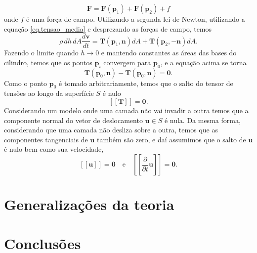 \begin{equation*}
\mathbf{F}=\mathbf{F}(\mathbf{p}_1)+\mathbf{F}(\mathbf{p}_2)+f
\end{equation*} 
onde $f$ \'e uma for\c{c}a de campo. Utilizando a segunda lei de Newton, utilizando a equa\c{c}\~ao \ref{eq.tensao_media} e desprezando as for\c{c}as de campo, temos
\begin{equation*}
\rho\,dh\,dA\frac{d\mathbf{v}}{dt}=\mathbf{T}(\mathbf{p}_1,\mathbf{n})dA+\mathbf{T}(\mathbf{p}_2,-\mathbf{n})dA.
\end{equation*} 
Fazendo o limite quando $h\to 0$ e mantendo constantes as \'areas das bases do cilindro, temos que os pontos $\mathbf{p}_i$ convergem para $\mathbf{p}_0$, e a equa\c{c}\~ao acima se torna
\begin{equation*}
\mathbf{T}(\mathbf{p}_0,\mathbf{n})-\mathbf{T}(\mathbf{p}_0,\mathbf{n})=\mathbf{0}.
\end{equation*}
Como o ponto $\mathbf{p}_0$ \'e tomado arbitrariamente, temos que o salto do tensor de tens\~oes ao longo da superf\'icie $S$ \'e nulo
\begin{equation*}
\left[\left[\mathbf{T}\right]\right]=\mathbf{0}.
\end{equation*}
Considerando um modelo onde uma camada n\~ao vai invadir a outra temos que a componente normal do vetor de deslocamento $\mathbf{u}\in S$ \'e nula. Da mesma forma, considerando que uma camada n\~ao desliza sobre a outra, temos que as componentes tangenciais de $\mathbf{u}$ tamb\'em s\~ao zero, e da\'i assumimos que o salto de $\mathbf{u}$ \'e nulo bem como sua velocidade,
\begin{equation*}
\left[\left[\mathbf{u}\right]\right]=\mathbf{0}\quad\text{e}\quad\left[\left[\frac{\partial}{\partial t}\mathbf{u}\right]\right]=\mathbf{0}.
\end{equation*}



\section{Generalizações da teoria}

\section{Conclusões}